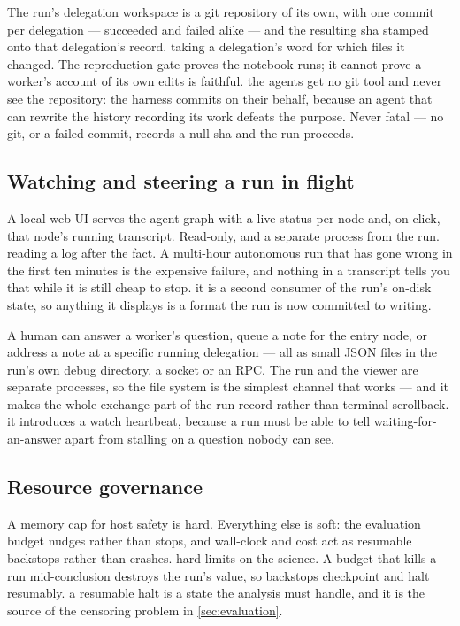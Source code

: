 {The run's delegation workspace is a git repository of its own, with one commit
per delegation --- succeeded and failed alike --- and the resulting sha stamped
onto that delegation's record.}
{taking a delegation's word for which files it changed. The reproduction gate
proves the notebook runs; it cannot prove a worker's account of its own edits is
faithful.}
{the agents get no git tool and never see the repository: the harness commits on
their behalf, because an agent that can rewrite the history recording its work
defeats the purpose. Never fatal --- no git, or a failed commit, records a null
sha and the run proceeds.}

\subsection{Watching and steering a run in flight}

{A local web UI serves the agent graph with a live status per node and, on
click, that node's running transcript. Read-only, and a separate process from
the run.}
{reading a log after the fact. A multi-hour autonomous run that has gone wrong
in the first ten minutes is the expensive failure, and nothing in a transcript
tells you that while it is still cheap to stop.}
{it is a second consumer of the run's on-disk state, so anything it displays is
a format the run is now committed to writing.}

{A human can answer a worker's question, queue a note for the entry node, or
address a note at a specific running delegation --- all as small JSON files in
the run's own debug directory.}
{a socket or an RPC. The run and the viewer are separate processes, so the file
system is the simplest channel that works --- and it makes the whole exchange
part of the run record rather than terminal scrollback.}
{it introduces a watch heartbeat, because a run must be able to tell
waiting-for-an-answer apart from stalling on a question nobody can see.}

\subsection{Resource governance}

{A memory cap for host safety is hard. Everything else is soft: the evaluation
budget nudges rather than stops, and wall-clock and cost act as resumable
backstops rather than crashes.}
{hard limits on the science. A budget that kills a run mid-conclusion destroys
the run's value, so backstops checkpoint and halt resumably.}
{a resumable halt is a state the analysis must handle, and it is the source of
the censoring problem in \cref{sec:evaluation}.}

